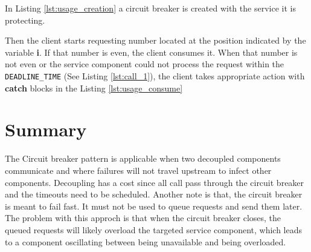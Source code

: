 \documentclass[a4paper,12pt]{article}
\begin{document}

 In Listing \ref{lst:usage_creation} a circuit breaker is created with the service it is protecting.
 

 Then the client starts requesting number located at the position indicated by the variable \textbf{i}.
 If that number is even, the client consumes it. When that number is not even or the service component could not process 
 the request within the \verb+DEADLINE_TIME+ (See Listing \ref{lst:call_1}), the client takes appropriate action with \textbf{catch} blocks in the Listing \ref{lst:usage_consume}


\section{Summary}
The Circuit breaker pattern is applicable when two decoupled components communicate and where failures will not travel upstream to infect other components. 
Decoupling has a cost since all call pass through the circuit breaker and the timeouts need to be scheduled.
Another note is that, the circuit breaker is meant to fail fast. It must not be used to queue requests and send them later. The problem with this approch is that when the circuit breaker closes, the queued requests will likely overload the targeted service component, which leads to a component oscillating between being unavailable and being overloaded.



\medskip
\nocite{*}
\printbibliography
\end{document}
